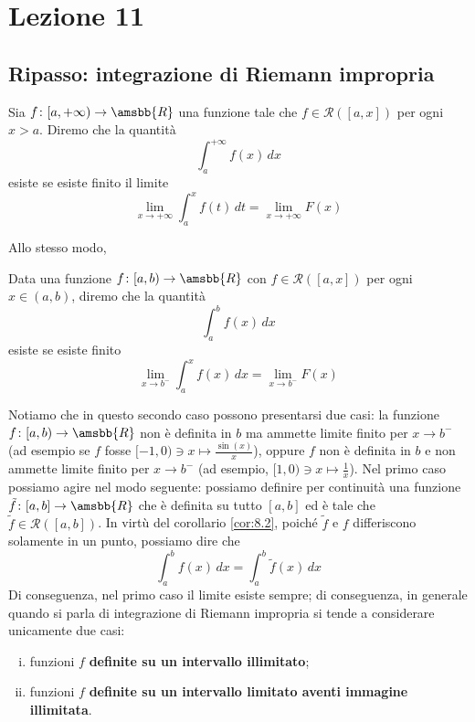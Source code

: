 \section{Lezione 11}
\subsection{Ripasso: integrazione di Riemann impropria}
\begin{definition}
    \label{def:10.1}
    Sia $f\colon[a,+\infty)\to \amsbb{R}$ una funzione tale che $f\in\mathscr{R}([a,x])$ per ogni $x>a$. Diremo che la quantità
    \[
    \int_a^{+\infty} f(x)\, dx
    \]
    esiste se esiste finito il limite
    \[
    \lim_{x\to +\infty} \int_a^x f(t)\, dt = \lim_{x\to+\infty} F(x)
    \]
\end{definition}
Allo stesso modo, 
\begin{definition}
    \label{def:10.2}
    Data una funzione $f\colon [a,b)\to\amsbb{R}$ con $f\in\mathscr{R}([a,x])$ per ogni $x\in(a,b)$, diremo che la quantità
    \[
    \int_a^b f(x)\, dx
    \]
    esiste se esiste finito
    \[
    \lim_{x\to b^-} \int_a^x f(x)\, dx = \lim_{x\to b^-} F(x)
    \]
\end{definition}
\begin{remark}
    Notiamo che in questo secondo caso possono presentarsi due casi: la funzione $f\colon[a,b)\to\amsbb{R}$ non è definita in $b$ ma ammette limite finito per $x\to b^-$ (ad esempio se $f$ fosse $[-1, 0)\ni x\mapsto \frac{\sin(x)}{x}$), oppure $f$ non è definita in $b$ e non ammette limite finito per $x\to b^-$ (ad esempio, $[1,0)\ni x\mapsto \frac{1}{x}$). Nel primo caso possiamo agire nel modo seguente: possiamo definire per continuità una funzione $\tilde{f}\colon[a,b]\to \amsbb{R}$ che è definita su tutto $[a,b]$ ed è tale che $\tilde{f}\in\mathscr{R}([a,b])$. In virtù del corollario \ref{cor:8.2}, poiché $\tilde{f}$ e $f$ differiscono solamente in un punto, possiamo dire che
    \[
    \int_a^b f(x)\, dx = \int_a^b \tilde{f}(x)\, dx
    \]
    Di conseguenza, nel primo caso il limite esiste sempre; di conseguenza, in generale quando si parla di integrazione di Riemann impropria si tende a considerare unicamente due casi:
    \begin{enumerate}[(i)]
        \item funzioni $f$ \textbf{definite su un intervallo illimitato};
        \item funzioni $f$ \textbf{definite su un intervallo limitato aventi immagine illimitata}.
    \end{enumerate}
\end{remark}

